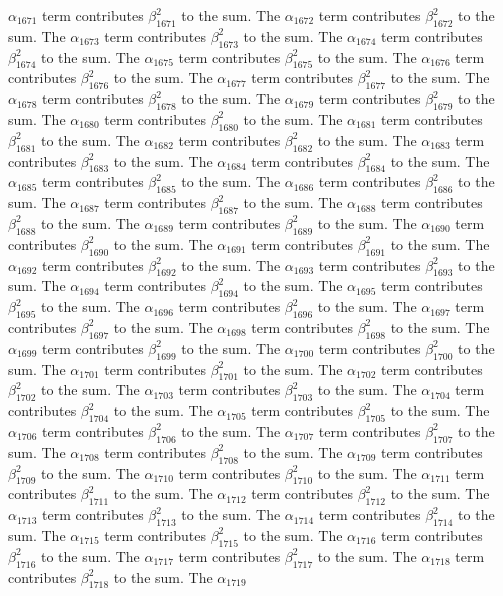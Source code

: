 \begin{lemma}
$\alpha_{1671}$ term contributes $\beta_{1671}^{2}$ to the sum. The $\alpha_{1672}$ term contributes $\beta_{1672}^{2}$ to the sum. The $\alpha_{1673}$ term contributes $\beta_{1673}^{2}$ to the sum. The $\alpha_{1674}$ term contributes $\beta_{1674}^{2}$ to the sum. The $\alpha_{1675}$ term contributes $\beta_{1675}^{2}$ to the sum. The $\alpha_{1676}$ term contributes $\beta_{1676}^{2}$ to the sum. The $\alpha_{1677}$ term contributes $\beta_{1677}^{2}$ to the sum. The $\alpha_{1678}$ term contributes $\beta_{1678}^{2}$ to the sum. The $\alpha_{1679}$ term contributes $\beta_{1679}^{2}$ to the sum. The $\alpha_{1680}$ term contributes $\beta_{1680}^{2}$ to the sum. The $\alpha_{1681}$ term contributes $\beta_{1681}^{2}$ to the sum. The $\alpha_{1682}$ term contributes $\beta_{1682}^{2}$ to the sum. The $\alpha_{1683}$ term contributes $\beta_{1683}^{2}$ to the sum. The $\alpha_{1684}$ term contributes $\beta_{1684}^{2}$ to the sum. The $\alpha_{1685}$ term contributes $\beta_{1685}^{2}$ to the sum. The $\alpha_{1686}$ term contributes $\beta_{1686}^{2}$ to the sum. The $\alpha_{1687}$ term contributes $\beta_{1687}^{2}$ to the sum. The $\alpha_{1688}$ term contributes $\beta_{1688}^{2}$ to the sum. The $\alpha_{1689}$ term contributes $\beta_{1689}^{2}$ to the sum. The $\alpha_{1690}$ term contributes $\beta_{1690}^{2}$ to the sum. The $\alpha_{1691}$ term contributes $\beta_{1691}^{2}$ to the sum. The $\alpha_{1692}$ term contributes $\beta_{1692}^{2}$ to the sum. The $\alpha_{1693}$ term contributes $\beta_{1693}^{2}$ to the sum. The $\alpha_{1694}$ term contributes $\beta_{1694}^{2}$ to the sum. The $\alpha_{1695}$ term contributes $\beta_{1695}^{2}$ to the sum. The $\alpha_{1696}$ term contributes $\beta_{1696}^{2}$ to the sum. The $\alpha_{1697}$ term contributes $\beta_{1697}^{2}$ to the sum. The $\alpha_{1698}$ term contributes $\beta_{1698}^{2}$ to the sum. The $\alpha_{1699}$ term contributes $\beta_{1699}^{2}$ to the sum. The $\alpha_{1700}$ term contributes $\beta_{1700}^{2}$ to the sum. The $\alpha_{1701}$ term contributes $\beta_{1701}^{2}$ to the sum. The $\alpha_{1702}$ term contributes $\beta_{1702}^{2}$ to the sum. The $\alpha_{1703}$ term contributes $\beta_{1703}^{2}$ to the sum. The $\alpha_{1704}$ term contributes $\beta_{1704}^{2}$ to the sum. The $\alpha_{1705}$ term contributes $\beta_{1705}^{2}$ to the sum. The $\alpha_{1706}$ term contributes $\beta_{1706}^{2}$ to the sum. The $\alpha_{1707}$ term contributes $\beta_{1707}^{2}$ to the sum. The $\alpha_{1708}$ term contributes $\beta_{1708}^{2}$ to the sum. The $\alpha_{1709}$ term contributes $\beta_{1709}^{2}$ to the sum. The $\alpha_{1710}$ term contributes $\beta_{1710}^{2}$ to the sum. The $\alpha_{1711}$ term contributes $\beta_{1711}^{2}$ to the sum. The $\alpha_{1712}$ term contributes $\beta_{1712}^{2}$ to the sum. The $\alpha_{1713}$ term contributes $\beta_{1713}^{2}$ to the sum. The $\alpha_{1714}$ term contributes $\beta_{1714}^{2}$ to the sum. The $\alpha_{1715}$ term contributes $\beta_{1715}^{2}$ to the sum. The $\alpha_{1716}$ term contributes $\beta_{1716}^{2}$ to the sum. The $\alpha_{1717}$ term contributes $\beta_{1717}^{2}$ to the sum. The $\alpha_{1718}$ term contributes $\beta_{1718}^{2}$ to the sum. The $\alpha_{1719}$ 
\end{lemma}
